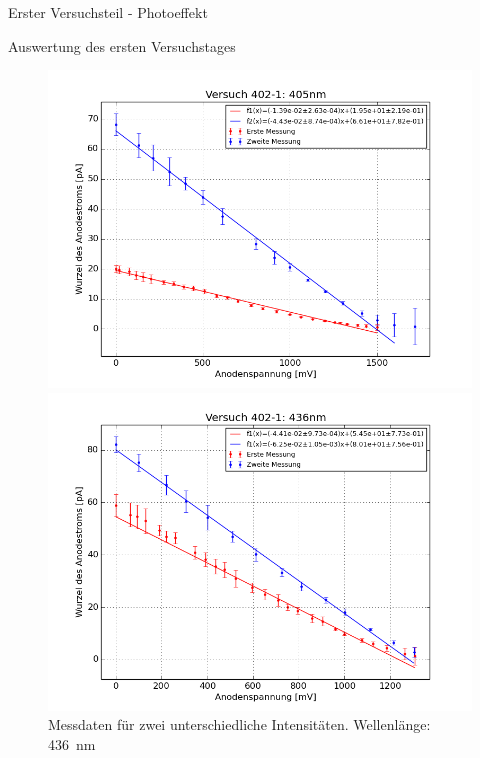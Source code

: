 \documentclass[pdftex, a4paper,11pt, twoside, ngerman]{report}
\begin{document}
\begin{chapter}{Erster Versuchsteil - Photoeffekt}
\begin{section}{Auswertung des ersten Versuchstages}
      \begin{figure}[htbp]
        \centering
        \begin{minipage}{0.48\textwidth}
          \centering
          \includegraphics[width=\textwidth]{Figures/Versuch402_1_405.png}
          \caption{Messdaten für zwei unterschiedliche Intensitäten. Wellenlänge: \SI{405}{\nano\meter}}\label{fig:Versuch402_1_405}
        \end{minipage}\quad
        \begin{minipage}{0.48\textwidth}
          \centering
          \includegraphics[width=\textwidth]{Figures/Versuch402_1_436.png}
          \caption{Messdaten für zwei unterschiedliche Intensitäten. Wellenlänge: \SI{436}{\nano\meter}}\label{fig:Versuch402_1_436}

\end{minipage}
\end{figure}
\end{section}
\end{chapter}
\end{document}
